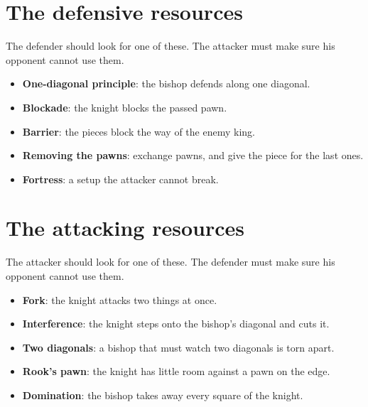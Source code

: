 
\section*{The defensive resources}
The defender should look for one of these. The attacker must make sure his opponent cannot use them.

\begin{itemize}
\item \textbf{One-diagonal principle}: the bishop defends along one diagonal.

\item \textbf{Blockade}: the knight blocks the passed pawn.

\item \textbf{Barrier}: the pieces block the way of the enemy king.

\item \textbf{Removing the pawns}: exchange pawns, and give the piece for the last ones.

\item \textbf{Fortress}: a setup the attacker cannot break.
\end{itemize}

\section*{The attacking resources}
The attacker should look for one of these. The defender must make sure his opponent cannot use them.

\begin{itemize}
\item \textbf{Fork}: the knight attacks two things at once.

\item \textbf{Interference}: the knight steps onto the bishop's diagonal and cuts it.

\item \textbf{Two diagonals}: a bishop that must watch two diagonals is torn apart.

\item \textbf{Rook's pawn}: the knight has little room against a pawn on the edge.

\item \textbf{Domination}: the bishop takes away every square of the knight.
\end{itemize}


